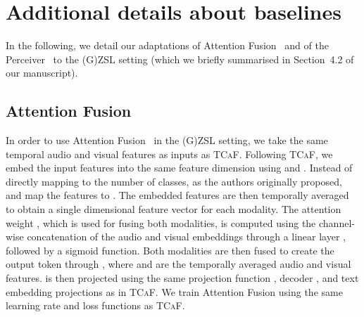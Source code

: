 \documentclass[runningheads]{llncs}
\newcommand{\modelName}{\textsc{TCaF}\xspace}
\begin{document}
\section{Additional details about baselines}
\label{section:baselines_details}
In the following, we detail our adaptations of Attention Fusion~\cite{fayek2020large} and of the Perceiver~\cite{jaegle2021perceiver} to the (G)ZSL setting (which we briefly summarised in Section~4.2 of our manuscript).

\subsection{Attention Fusion}
In order to use Attention Fusion~\cite{fayek2020large} in the (G)ZSL setting, we take the same temporal audio and visual features as inputs as \modelName. Following \modelName, we embed the input features into the same feature dimension using  and . Instead of directly mapping to the number of classes, as the authors originally proposed,  and  map the features to . The embedded features are then temporally averaged to obtain a single dimensional feature vector for each modality. The attention weight , which is used for fusing both modalities, is computed using the channel-wise concatenation of the audio and visual embeddings through a linear layer , followed by a sigmoid function. Both modalities are then fused to create the output token  through , where  and  are the temporally averaged audio and visual features.  is then projected using the same projection function , decoder , and text embedding projections as in \modelName. We train Attention Fusion using the same learning rate and loss functions as \modelName.
 
\end{document}
